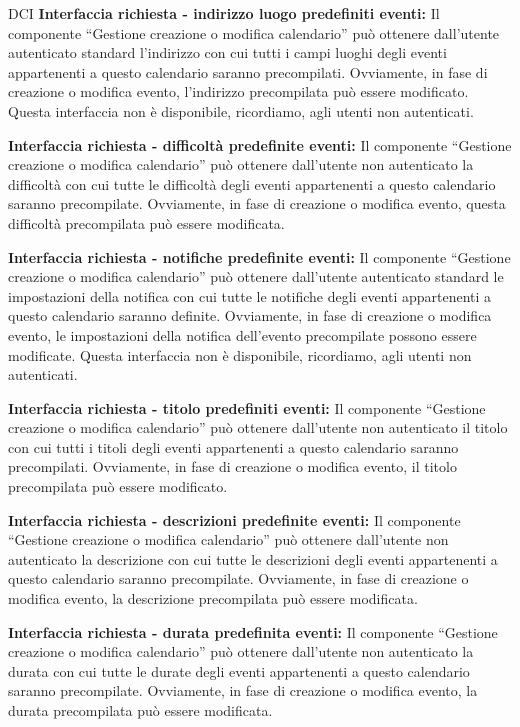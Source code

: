 \begin{listaPersonale}{DCI}
    \textbf{Interfaccia richiesta - indirizzo luogo predefiniti eventi:} Il componente “Gestione creazione o modifica calendario” può ottenere dall'utente autenticato standard l'indirizzo con cui tutti i campi luoghi degli eventi appartenenti a questo calendario saranno precompilati. Ovviamente, in fase di creazione o modifica evento, l'indirizzo precompilata può essere modificato. Questa interfaccia non è disponibile, ricordiamo, agli utenti non autenticati.

    \textbf{Interfaccia richiesta - difficoltà predefinite eventi:} Il componente “Gestione creazione o modifica calendario” può ottenere dall'utente non autenticato la difficoltà con cui tutte le difficoltà degli eventi appartenenti a questo calendario saranno precompilate. Ovviamente, in fase di creazione o modifica evento, questa difficoltà precompilata può essere modificata.

    \textbf{Interfaccia richiesta - notifiche predefinite eventi:} Il componente “Gestione creazione o modifica calendario” può ottenere dall'utente autenticato standard le impostazioni della notifica con cui tutte le notifiche degli eventi appartenenti a questo calendario saranno definite. Ovviamente, in fase di creazione o modifica evento, le impostazioni della notifica dell'evento precompilate possono essere modificate. Questa interfaccia non è disponibile, ricordiamo, agli utenti non autenticati.

    \textbf{Interfaccia richiesta - titolo predefiniti eventi:} Il componente “Gestione creazione o modifica calendario” può ottenere dall'utente non autenticato il titolo con cui tutti i titoli degli eventi appartenenti a questo calendario saranno precompilati. Ovviamente, in fase di creazione o modifica evento, il titolo precompilata può essere modificato.

    \textbf{Interfaccia richiesta - descrizioni predefinite eventi:} Il componente “Gestione creazione o modifica calendario” può ottenere dall'utente non autenticato la descrizione con cui tutte le descrizioni degli eventi appartenenti a questo calendario saranno precompilate. Ovviamente, in fase di creazione o modifica evento, la descrizione precompilata può essere modificata.

    \textbf{Interfaccia richiesta - durata predefinita eventi:} Il componente “Gestione creazione o modifica calendario” può ottenere dall'utente non autenticato la durata con cui tutte le durate degli eventi appartenenti a questo calendario saranno precompilate. Ovviamente, in fase di creazione o modifica evento, la durata precompilata può essere modificata.


\end{listaPersonale}
